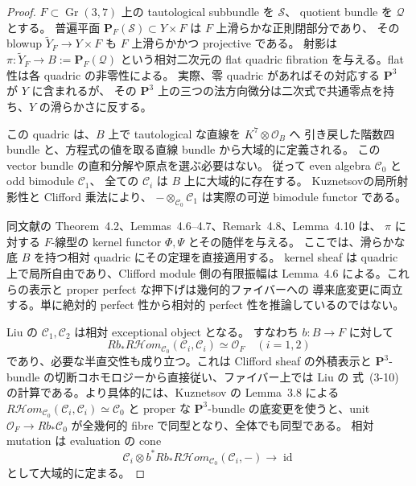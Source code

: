 \begin{proof}
$F\subset\operatorname{Gr}(3,7)$ 上の tautological subbundle を $\mathcal S$、
quotient bundle を $\mathcal Q$ とする。
普遍平面 $\mathbf P_F(\mathcal S)\subset Y\times F$ は $F$ 上滑らかな正則閉部分であり、
その blowup $\widetilde Y_F\to Y\times F$ も $F$ 上滑らかかつ projective である。
射影は $\pi:\widetilde Y_F\to B:=\mathbf P_F(\mathcal Q)$ という相対二次元の
flat quadric fibration を与える。flat 性は各 quadric の非零性による。
実際、零 quadric があればその対応する $\mathbf P^3$ が $Y$ に含まれるが、
その $\mathbf P^3$ 上の三つの法方向微分は二次式で共通零点を持ち、$Y$ の滑らかさに反する。

この quadric は、$B$ 上で tautological な直線を $K^7\otimes\mathcal O_B$ へ
引き戻した階数四 bundle と、方程式の値を取る直線 bundle から大域的に定義される。
この vector bundle の直和分解や原点を選ぶ必要はない。
従って even algebra $\mathcal C_0$ と odd bimodule $\mathcal C_1$、
全ての $\mathcal C_i$ は $B$ 上に大域的に存在する。
Kuznetsov\cite[Lemma~3.8]{NFMKuznetsovQuadric}の局所射影性と Clifford 乗法により、
$-\otimes_{\mathcal C_0}\mathcal C_1$ は実際の可逆 bimodule functor である。

同文献の Theorem~4.2、Lemmas~4.6--4.7、Remark~4.8、Lemma~4.10 は、
$\pi$ に対する $F$-線型の kernel functor $\Phi,\Psi$ とその随伴を与える。
ここでは、滑らかな底 $B$ を持つ相対 quadric にその定理を直接適用する。
kernel sheaf は quadric 上で局所自由であり、Clifford module 側の有限振幅は
Lemma~4.6 による。これらの表示と proper perfect な押下げは幾何的ファイバーへの
導来底変更に両立する。単に絶対的 perfect 性から相対的 perfect 性を推論しているのではない。

Liu の $\mathcal C_1,\mathcal C_2$ は相対 exceptional object となる。
すなわち $b:B\to F$ に対して
\[
 Rb_*R\mathcal Hom_{\mathcal C_0}(\mathcal C_i,\mathcal C_i)
 \simeq\mathcal O_F\quad(i=1,2)
\]
であり、必要な半直交性も成り立つ。これは Clifford sheaf の外積表示と
$\mathbf P^3$-bundle の切断コホモロジーから直接従い、ファイバー上では Liu の
式~(3-10) の計算である。より具体的には、Kuznetsov の Lemma~3.8 による
$R\mathcal Hom_{\mathcal C_0}(\mathcal C_i,\mathcal C_i)\simeq\mathcal C_0$ と
proper な $\mathbf P^3$-bundle の底変更を使うと、unit
$\mathcal O_F\to Rb_*\mathcal C_0$ が全幾何的 fibre で同型となり、全体でも同型である。
相対 mutation は evaluation の cone
\[
 \mathcal C_i\otimes b^*Rb_*R\mathcal Hom_{\mathcal C_0}(\mathcal C_i,-)
 \longrightarrow\operatorname{id}
\]
として大域的に定まる。


\end{proof}

